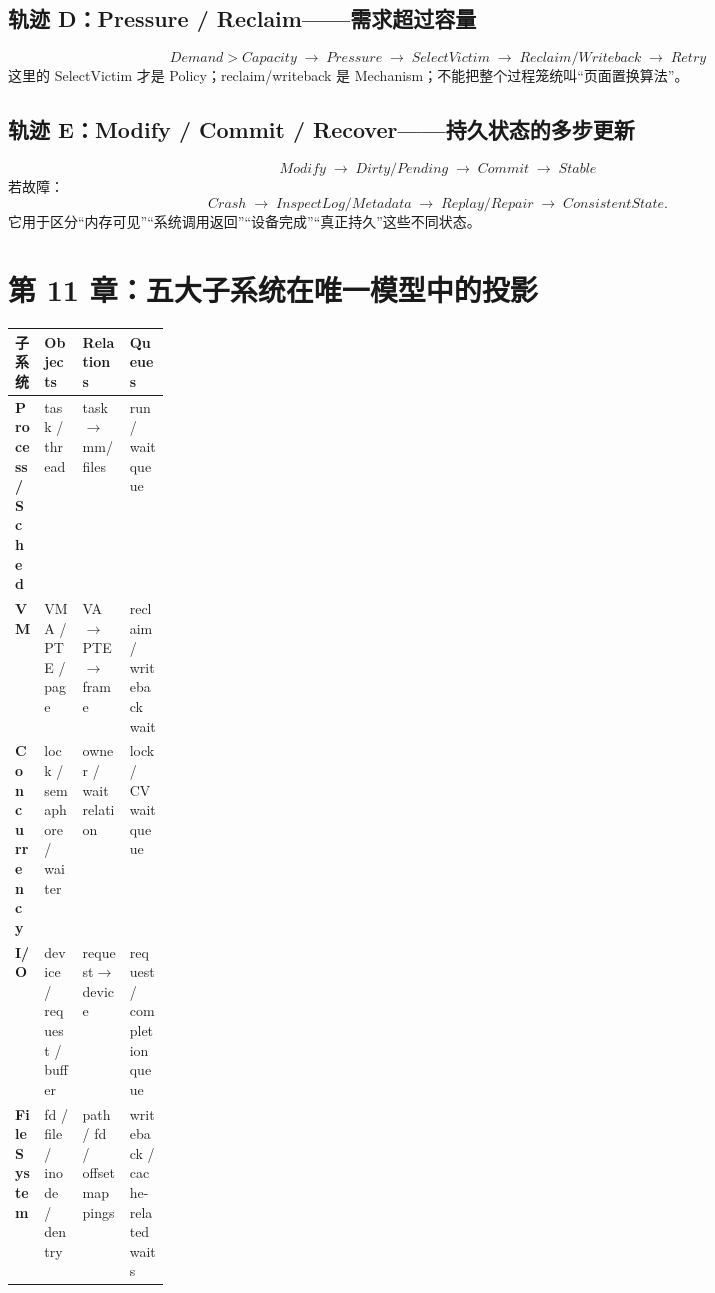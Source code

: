 \documentclass[11pt,a4paper]{ctexart}
\newcommand{\arr}{\;\longrightarrow\;}
\begin{document}
\subsection{轨迹 D：Pressure / Reclaim——需求超过容量}
\[
\boxed{Demand>Capacity\arr Pressure\arr SelectVictim\arr Reclaim/Writeback\arr Retry}
\]
这里的 SelectVictim 才是 Policy；reclaim/writeback 是 Mechanism；不能把整个过程笼统叫“页面置换算法”。

\subsection{轨迹 E：Modify / Commit / Recover——持久状态的多步更新}
\[
\boxed{Modify\arr Dirty/Pending\arr Commit\arr Stable}
\]
若故障：
\[
\boxed{Crash\arr InspectLog/Metadata\arr Replay/Repair\arr ConsistentState}.
\]
它用于区分“内存可见”“系统调用返回”“设备完成”“真正持久”这些不同状态。

\section{第 11 章：五大子系统在唯一模型中的投影}

\begin{center}
\scriptsize
\renewcommand{\arraystretch}{1.18}
\begin{tabularx}{\linewidth}{>{\bfseries}p{0.18\linewidth} Y Y Y}
\toprule
子系统 & Objects & Relations & Queues \\
\midrule
Process/Sched & task / thread & task$\to$mm/files & run / wait queue \\
VM & VMA / PTE / page & VA$\to$PTE$\to$frame & reclaim / writeback wait \\
Concurrency & lock / semaphore / waiter & owner / wait relation & lock / CV wait queue \\
I/O & device / request / buffer & request$\to$device & request / completion queue \\
File System & fd / file / inode / dentry & path / fd / offset mappings & writeback / cache-related waits \\
\bottomrule
\end{tabularx}
\end{center}
\end{document}
